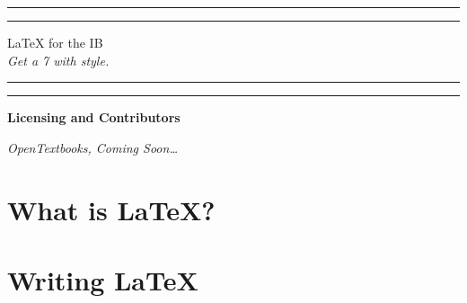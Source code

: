 \documentclass[12pt,a4paper]{article}
\begin{document}

\begin{titlepage}
\centering %
\scshape %
\vfill

\rule{\textwidth}{1.6pt}\vspace*{-\baselineskip}\vspace*{2pt}
\rule{\textwidth}{0.4pt}

\vspace{1.5\baselineskip} %
\LARGE{\LaTeX{} for the IB}\\
\vspace{0.2\baselineskip}
\small{\textit{Get a 7 with style.}}
\vspace{0.75\baselineskip} %

\rule{\textwidth}{0.4pt}\vspace*{-\baselineskip}\vspace{3.2pt}
\rule{\textwidth}{1.6pt}

\vfill
\end{titlepage}



\begin{center}
\Large{\textbf{Licensing and Contributors}}

\vfill
\small{\textit{OpenTextbooks, Coming Soon\texttrademark\dots}}
\vfill

\newpage
\end{center}

\begin{center}
\tableofcontents
\newpage
\end{center}


\section{What is LaTeX?}





\newpage
\section{Writing LaTeX}
\end{document}

